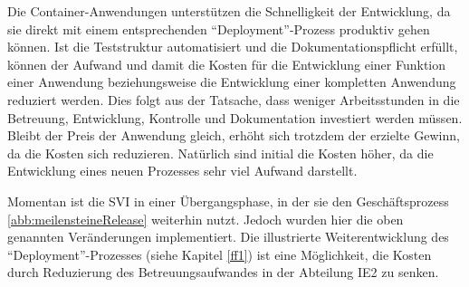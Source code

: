 \par
Die Container-Anwendungen unterstützen die Schnelligkeit der Entwicklung, da sie direkt mit einem entsprechenden \enquote{Deployment}-Prozess produktiv gehen können. Ist die Teststruktur automatisiert und die Dokumentationspflicht erfüllt, können der Aufwand und damit die Kosten für die Entwicklung einer Funktion einer Anwendung beziehungsweise die Entwicklung einer kompletten Anwendung reduziert werden. Dies folgt aus der Tatsache, dass weniger Arbeitsstunden in die Betreuung, Entwicklung, Kontrolle und Dokumentation investiert werden müssen. Bleibt der Preis der Anwendung gleich, erhöht sich trotzdem der erzielte Gewinn, da die Kosten sich reduzieren. Natürlich sind initial die Kosten höher, da die Entwicklung eines neuen Prozesses sehr viel Aufwand darstellt.
\par
Momentan ist die \ac{SVI} in einer Übergangsphase, in der sie den Geschäftsprozess \vref{abb:meilensteineRelease} weiterhin nutzt. Jedoch wurden hier die oben genannten Veränderungen implementiert. Die illustrierte Weiterentwicklung des \enquote{Deployment}-Prozesses (siehe Kapitel \vref{ff1}) ist eine Möglichkeit, die Kosten durch Reduzierung des Betreuungsaufwandes in der Abteilung \ac{IE2} zu senken.

